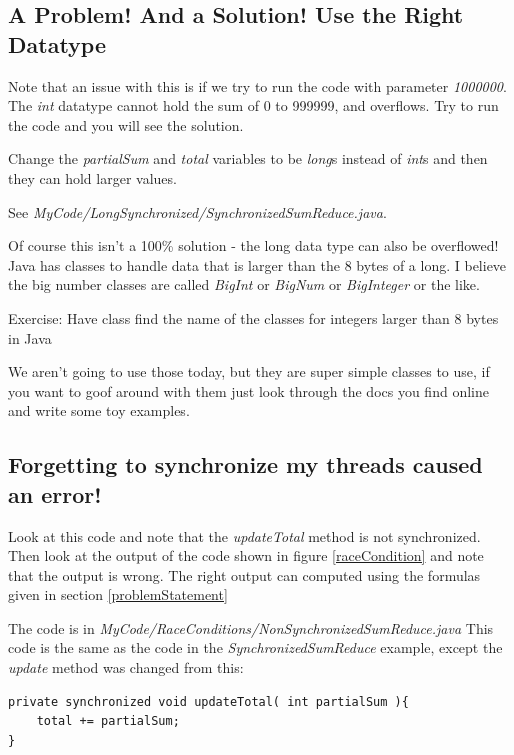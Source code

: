 \documentclass[12pt]{article}
\begin{document}


\subsection{A Problem! And a Solution! Use the Right Datatype}
Note that an issue with this is if we try to run the code with parameter
\textit{1000000}. The \textit{int} datatype cannot hold the sum of 0 to 999999,
and overflows. Try to run the code and you will see the solution.

Change the \textit{partialSum} and \textit{total} variables to be \textit{long}s
instead of \textit{int}s and then they can hold larger values.

See \textit{MyCode/LongSynchronized/SynchronizedSumReduce.java}. 

Of course this isn't a 100\% solution - the long data type can also be
overflowed! Java has classes to handle data that is larger than the 8 bytes of a
long. I believe the big number classes are called \textit{BigInt} or
\textit{BigNum} or \textit{BigInteger} or the like.

{\Large Exercise: Have class find the name of the classes for integers larger
than 8 bytes in Java}

We aren't going to use those today, but they are super simple classes to use,
if you want to goof around with them just look through the docs you find online
and write some toy examples.


\subsection{Forgetting to synchronize my threads caused an error!}

Look at this code and note that the \textit{updateTotal} method is not
synchronized. Then look at the output of the code shown in figure
\ref{raceCondition}  and note that the output is wrong. The right output can
computed using the formulas given in section \ref{problemStatement}

The code is in \textit{MyCode/RaceConditions/NonSynchronizedSumReduce.java} This
code is the same as the code in the \textit{SynchronizedSumReduce} example,
except the \textit{update} method was changed from this:

\begin{lstlisting}
private synchronized void updateTotal( int partialSum ){
	total += partialSum;
}
\end{lstlisting}
\end{document}

